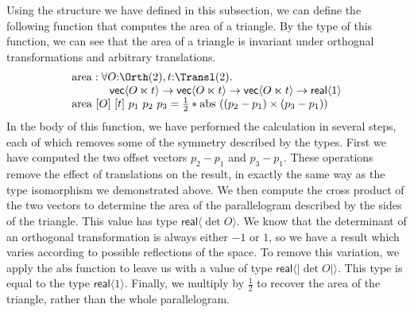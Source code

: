 \begin{example}
  Using the structure we have defined in this subsection, we can
  define the following function that computes the area of a
  triangle. By the type of this function, we can see that the area of
  a triangle is invariant under orthognal transformations and
  arbitrary translations.
  \begin{displaymath}
    \begin{array}{l}
      \mathrm{area} : \forall O\mathord:\Orth(2), t\mathord:\Transl(2).\ \\
      \hspace{1.2cm}\mathsf{vec}\langle O \ltimes t \rangle \to \mathsf{vec}\langle O \ltimes t \rangle \to \mathsf{vec}\langle O \ltimes t \rangle \to \mathsf{real}\langle 1 \rangle \\
      \mathrm{area}\ [O]\ [t]\ p_1\ p_2\ p_3 = \frac{1}{2} * \mathrm{abs}\ ((p_2 - p_1) \times (p_3 - p_1))
    \end{array}
  \end{displaymath}
  In the body of this function, we have performed the calculation in
  several steps, each of which removes some of the symmetry described
  by the types. First we have computed the two offset vectors $p_2 -
  p_1$ and $p_3 - p_1$. These operations remove the effect of
  translations on the result, in exactly the same way as the type
  isomorphism we demonstrated above. We then compute the cross product
  of the two vectors to determine the area of the parallelogram
  described by the sides of the triangle. This value has type
  $\mathsf{real}\langle \det O \rangle$. We know that the determinant
  of an orthogonal transformation is always either $-1$ or $1$, so we
  have a result which varies according to possible reflections of the
  space. To remove this variation, we apply the $\mathrm{abs}$
  function to leave us with a value of type $\mathsf{real}\langle
  |\det O| \rangle$. This type is equal to the type
  $\mathsf{real}\langle 1 \rangle$. Finally, we multiply by
  $\frac{1}{2}$ to recover the area of the triangle, rather than the
  whole parallelogram.
\end{example}
